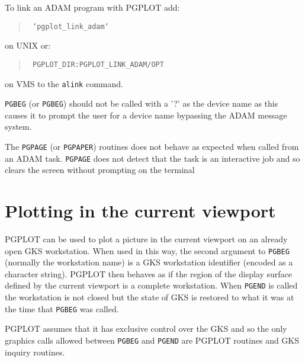 To link an ADAM program with PGPLOT add:
\begin{quote}\tt
	`pgplot\_link\_adam`
\end{quote}
on UNIX  or:
\begin{quote}\tt
	PGPLOT\_DIR:PGPLOT\_LINK\_ADAM/OPT 
\end{quote}
on VMS to the {\tt alink} command.

{\tt PGBEG} (or {\tt PGBEG}) should not be called with a '?' as the device
name as this causes it to prompt the user for a device name
bypassing the ADAM message system.

The {\tt PGPAGE} (or {\tt PGPAPER}) routines does not behave as expected
when called from an ADAM task. {\tt PGPAGE} does not detect that
the task is an interactive job and so clears the screen without
prompting on the terminal

\section{Plotting in the current viewport}\label{viewport}

PGPLOT can be used to plot a picture in the current viewport on an already open
GKS workstation. When used in this way, the second argument to {\tt PGBEG}
(normally the workstation name) is a GKS workstation identifier (encoded as a
character string). PGPLOT then behaves as if the region of the display surface
defined by the current viewport is a complete workstation. When {\tt PGEND} is
called the workstation is not closed but the state of GKS is restored to what
it was at the time that {\tt PGBEG} was called. 

PGPLOT assumes that it has exclusive control over the GKS and so the only
graphics calls allowed between {\tt PGBEG} and {\tt PGEND} are PGPLOT
routines and GKS inquiry routines. 

